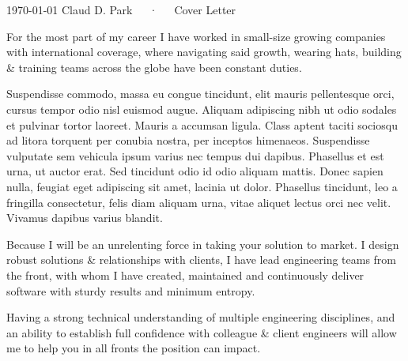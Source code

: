 \documentclass[11pt, a4paper]{awesome-cv}
\begin{document}
\makecvheader[R]

\makecvfooter
  {\today}
  {Claud D. Park~~~·~~~Cover Letter}
  {}

\makelettertitle

\begin{cvletter}

For the most part of my career I have worked in small-size growing companies with international coverage, where navigating said growth, wearing hats, building \& training teams across the globe have been constant duties.

Suspendisse commodo, massa eu congue tincidunt, elit mauris pellentesque orci, cursus tempor odio nisl euismod augue. Aliquam adipiscing nibh ut odio sodales et pulvinar tortor laoreet. Mauris a accumsan ligula. Class aptent taciti sociosqu ad litora torquent per conubia nostra, per inceptos himenaeos. Suspendisse vulputate sem vehicula ipsum varius nec tempus dui dapibus. Phasellus et est urna, ut auctor erat. Sed tincidunt odio id odio aliquam mattis. Donec sapien nulla, feugiat eget adipiscing sit amet, lacinia ut dolor. Phasellus tincidunt, leo a fringilla consectetur, felis diam aliquam urna, vitae aliquet lectus orci nec velit. Vivamus dapibus varius blandit.

Because I will be an unrelenting force in taking your solution to market. I design robust solutions \& relationships with clients, I have lead engineering teams from the front, with whom I have created, maintained and continuously deliver software with sturdy results and minimum entropy.

Having a strong technical understanding of multiple engineering disciplines, and an ability to establish full confidence with colleague \& client engineers will allow me to help you in all fronts the position can impact. 

\end{cvletter}


\makeletterclosing
\end{document}
